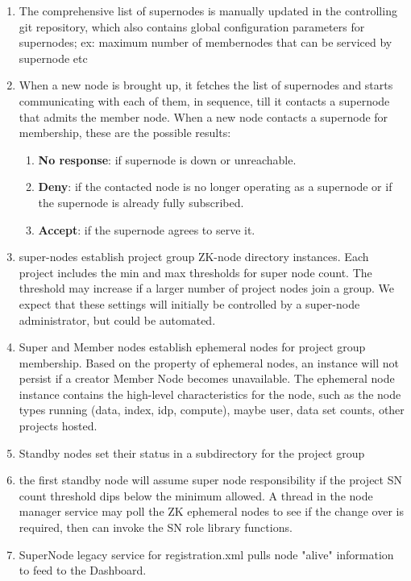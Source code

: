 \documentclass[oneside,12pt]{memoir}
\begin{document}
\begin{enumerate}
\item The comprehensive list of supernodes is manually updated in the controlling git repository, which also contains global configuration parameters for supernodes; ex: maximum number of membernodes that can be serviced by supernode etc
\item When a new node is brought up, it fetches the list of supernodes and starts communicating with each of them, in sequence, till it contacts a supernode that admits the member node. When a new node contacts a supernode for membership, these are the possible results:
\begin{enumerate}
\item \textbf{No response}: if supernode is down or unreachable.
\item \textbf{Deny}: if the contacted node is no longer operating as a supernode or if the supernode is already fully subscribed.
\item \textbf{Accept}: if the supernode agrees to serve it.
\end{enumerate}
\item super-nodes establish project group ZK-node directory instances.  Each project includes the min and max thresholds for super node count.  The threshold may increase if a larger number of project nodes join a group.  We expect that these settings will initially be controlled by a super-node administrator, but could be automated.


\item Super and Member nodes establish ephemeral nodes for project group membership.  Based on the property of ephemeral nodes, an instance will not persist if a creator Member Node becomes unavailable.  The ephemeral node instance contains the high-level characteristics for the node, such as the node types running (data, index, idp, compute),  maybe user, data set counts, other projects hosted.  
\item Standby nodes set their status in a subdirectory for the project group

\item the first standby node will assume super node responsibility if the project SN count threshold dips below the minimum allowed.  A thread in the node manager service may poll the ZK ephemeral nodes to see if the change over is required, then can invoke the SN role library functions.
\item SuperNode legacy service for registration.xml pulls node "alive" information to feed to the Dashboard.  

\end{enumerate}
\end{document}
